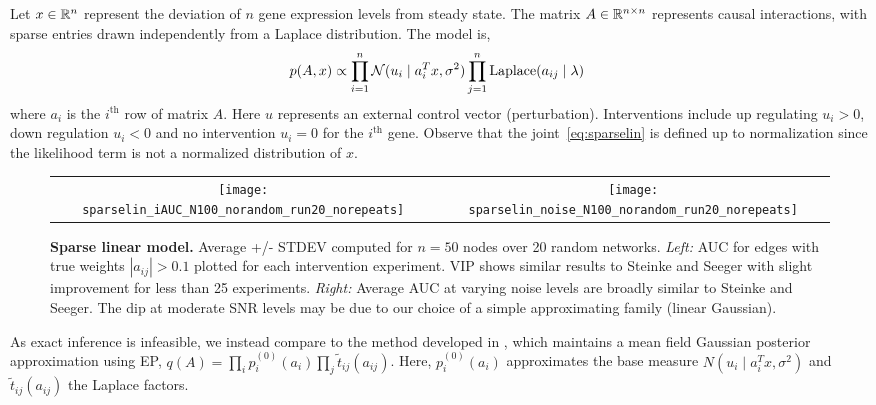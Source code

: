 Let $x\in\mathbb{R}^n$ represent the deviation of $n$ gene expression levels
from steady state.  The matrix $A\in\mathbb{R}^{n\times n}$ represents causal
interactions, with sparse entries drawn independently from a Laplace
distribution.  The model is,
\begin{equation}\label{eq:sparselin}
  \!\!\!p(A,x) \propto \prod_{i=1}^n \mathcal{N}(u_i \mid a_i^T
    x, \sigma^2) \prod_{j=1}^n \textrm{Laplace}(a_{ij} \mid \lambda) 
\end{equation}
where $a_i$ is the $i^{\text{th}}$ row of matrix $A$.  Here $u$
represents an external control vector (perturbation).  Interventions
include up regulating $u_i>0$, down regulation $u_i<0$ and no
intervention $u_i=0$ for the $i^{\text{th}}$ gene.  Observe that the
joint~\eqref{eq:sparselin} is defined up to normalization since the
likelihood term is not a normalized distribution of $x$.

\begin{figure}[t]
  \centering
  \begin{tabular}{cc}
    \hspace{-3mm}\texttt{[image: sparselin\_iAUC\_N100\_norandom\_run20\_norepeats]} &
    \hspace{-3mm}\texttt{[image: sparselin\_noise\_N100\_norandom\_run20\_norepeats]}
  \end{tabular}
  \caption{\small\textbf{Sparse linear model.} Average +/- STDEV
    computed for $n=50$ nodes over 20 random networks.  \emph{Left:}
    AUC for edges with true weights $|a_{ij}|>0.1$ plotted for each
    intervention experiment.  VIP shows similar results to Steinke and
    Seeger with slight improvement for less than 25 experiments.
    \emph{Right:} Average AUC at varying noise levels are broadly
    similar to Steinke and Seeger. The dip at moderate SNR levels may
    be due to our choice of a simple approximating family (linear
    Gaussian).}
  \label{fig:sparselin}
\end{figure}

As exact inference is infeasible, we instead compare to the method
developed in \cite{steinke2007experimental, seeger2008bayesian}, which
maintains a mean field Gaussian posterior approximation using EP,
\mbox{$q(A) = \prod_i p_i^{(0)}(a_i) \prod_j
  \widetilde{t}_{ij}(a_{ij})$}.  Here, $p^{(0)}_i(a_i)$ approximates
the base measure \mbox{$N(u_i \mid a_i^T x, \sigma^2)$} and
\mbox{$\widetilde{t}_{ij}(a_{ij})$} the Laplace factors.

